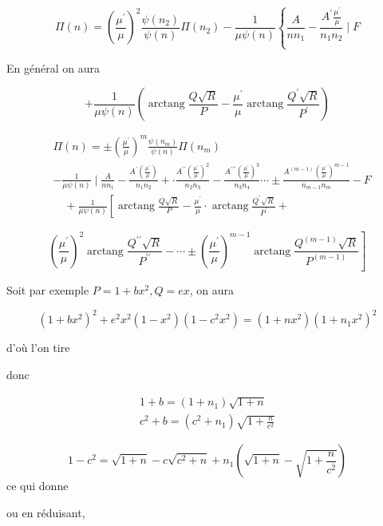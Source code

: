 \documentclass{article}
\begin{document}
\[
\Pi(n)=\left(\frac{\mu^{\prime}}{\mu}\right)^{2} \frac{\psi\left(n_{2}\right)}{\psi(n)} \Pi\left(n_{2}\right)-\frac{1}{\mu \psi(n)}\left\{\frac{A}{n n_{1}}-\frac{A^{\prime} \frac{\mu^{\prime}}{\mu}}{n_{1} n_{2}} \mid F\right.
\]

En général on aura

\[
+\frac{1}{\mu \psi(n)}\left(\operatorname{arctang} \frac{Q \sqrt{R}}{P}-\frac{\mu^{\prime}}{\mu} \operatorname{arctang} \frac{Q^{\prime} \sqrt{R}}{P^{\prime}}\right)
\]

\[
\begin{aligned}
& \Pi(n)= \pm\left(\frac{\mu^{\prime}}{\mu}\right)^{m} \frac{\psi\left(n_{m}\right)}{\psi(n)} \Pi\left(n_{m}\right) \\
& -\frac{1}{\mu \psi(n)} \mid \frac{A}{n n_{1}}-\frac{A^{\prime}\left(\frac{\mu^{\prime}}{\mu}\right)}{n_{1} n_{2}}+\cdot \frac{A^{\prime \prime}\left(\frac{\mu^{\prime}}{\mu}\right)^{2}}{n_{2} n_{3}}-\frac{A^{\prime \prime \prime}\left(\frac{\mu^{\prime}}{\mu}\right)^{3}}{n_{3} n_{4}} \cdots \pm \frac{A^{(m-1)}\left(\frac{\mu^{\prime}}{\mu}\right)^{m-1}}{n_{m-1} n_{m}}-F \\
& \quad+\frac{1}{\mu \psi(n)}\left[\operatorname{arctang} \frac{Q \sqrt{R}}{P}-\frac{\mu^{\prime}}{\mu} \cdot \operatorname{arctang} \frac{Q^{\prime} \sqrt{R}}{P^{\prime}}+\right.
\end{aligned}
\]

\[
\left.\left(\frac{\mu^{\prime}}{\mu}\right)^{2} \operatorname{arctang} \frac{Q^{\prime \prime} \sqrt{R}}{P^{\prime \prime}}-\cdots \pm\left(\frac{\mu^{\prime}}{\mu}\right)^{m-1} \operatorname{arctang} \frac{Q^{(m-1)} \sqrt{R}}{P^{(m-1)}}\right]
\]

Soit par exemple \(P=1+b x^{2}, Q=e x\), on aura

\[
\left(1+b x^{2}\right)^{2}+e^{2} x^{2}\left(1-x^{2}\right)\left(1-c^{2} x^{2}\right)=\left(1+n x^{2}\right)\left(1+n_{1} x^{2}\right)^{2}
\]

d'où l'on tire

donc

\[
\begin{gathered}
1+b=\left(1+n_{1}\right) \sqrt{1+n} \\
c^{2}+b=\left(c^{2}+n_{1}\right) \sqrt{1+\frac{n}{c^{2}}}
\end{gathered}
\]

\[
1-c^{2}=\sqrt{1+n}-c \sqrt{c^{2}+n}+n_{1}\left(\sqrt{1+n}-\sqrt{1+\frac{n}{c^{\overline{2}}}}\right)
\]
ce qui donne

ou en réduisant,
\end{document}
